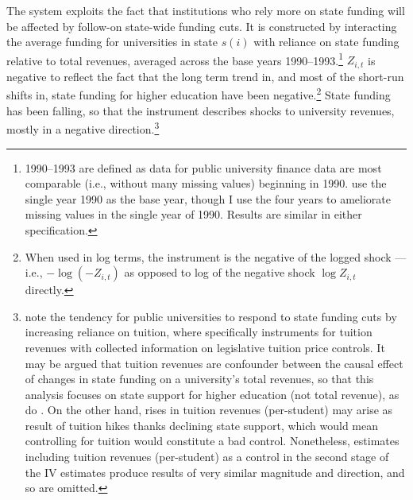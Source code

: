 The system exploits the fact that institutions who rely more on state funding will be affected by follow-on state-wide funding cuts.
It is constructed by interacting the average funding for universities in state $s(i)$ with reliance on state funding relative to total revenues, averaged across the base years 1990--1993.\footnote{
    1990--1993 are defined as data for public university finance data are most comparable (i.e., without many missing values) beginning in 1990.
    \cite{NBERw23736} use the single year 1990 as the base year, though I use the four years to ameliorate missing values in the single year of 1990.
    Results are similar in either specification.
}
$Z_{i,t}$ is negative to reflect the fact that the long term trend in, and most of the short-run shifts in, state funding for higher education have been negative.\footnote{
    When used in log terms, the instrument is the negative of the logged shock --- i.e., $- \log \left( -Z_{i,t} \right)$ as opposed to log of the negative shock $\log Z_{i,t}$ directly.
}
State funding has been falling, so that the instrument describes shocks to university revenues, mostly in a negative direction.\footnote{
    \label{foot:control}
    \cite{NBERw27885,webber2017state} note the tendency for public universities to respond to state funding cuts by increasing reliance on tuition, where \cite{NBERw23736} specifically instruments for tuition revenues with collected information on legislative tuition price controls.
    It may be argued that tuition revenues are confounder between the causal effect of changes in state funding on a university's total revenues, so that this analysis focuses on state support for higher education (not total revenue), as do \cite{NBERw27885}.
    On the other hand, rises in tuition revenues (per-student) may arise as result of tuition hikes thanks declining state support, which would mean controlling for tuition would constitute a bad control.
    Nonetheless, estimates including tuition revenues (per-student) as a control in the second stage of the IV estimates produce results of very similar magnitude and direction, and so are omitted.
}


